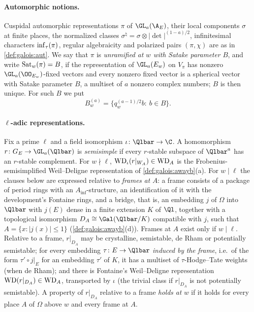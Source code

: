 \paragraph{Automorphic notions.} Cuspidal automorphic representations $\pi$ of $\GL_a(\A_E)$, their local
components $\sigma$ at finite places, the normalized classes $\sigma^\natural=\sigma\otimes|\det|^{(1-a)/2}$,
infinitesimal characters $\operatorname{inf}_\tau(\pi)$, regular algebraicity and polarized pairs $(\pi,\chi)$ are as in
\cref{def:galois:aut}. We say that $\pi$ is \emph{unramified at $w$ with Satake parameter $B$}, and write
$\operatorname{Sat}_w(\pi)=B$, if the representation of $\GL_a(E_w)$ on $V_\pi$ has nonzero $\GL_a(\OO_{E_w})$-fixed
vectors and every nonzero fixed vector is a spherical vector with Satake parameter $B$, a multiset of $a$ nonzero
complex numbers; $B$ is then unique. For such $B$ we put
\[
  B^{(a)}_w=\{q_w^{(a-1)/2}b:\ b\in B\}.
\]

\paragraph{$\ell$-adic representations.} Fix a prime $\ell$ and a field isomorphism $\iota\colon\Qlbar\to\C$. A
homomorphism $r\colon G_E\to\GL_a(\Qlbar)$ is \emph{semisimple} if every $r$-stable subspace of $\Qlbar^a$ has an
$r$-stable complement. For $w\nmid\ell$, $\mathrm{WD}_\iota(r|_{W_A})\in\mathrm{WD}_A$ is the Frobenius-semisimplified
Weil--Deligne representation of \cref{def:galois:awayb}(a). For $w\mid\ell$ the clauses below are expressed
relative to \emph{frames at $A$}: a frame consists of a package of period rings with an $A_{\inf}$-structure, an
identification of it with the development's Fontaine rings, and a bridge, that is, an embedding $j$ of $\Omega$
into $\Qlbar$ with $j(E)$ dense in a finite extension $K$ of $\Ql$, together with a topological isomorphism
$D_A\cong\Gal(\Qlbar/K)$ compatible with $j$, such that $A=\{x:|j(x)|\le1\}$ (\cref{def:galois:awayb}(d)). Frames
at $A$ exist only if $w\mid\ell$. Relative to a frame, $r|_{D_A}$ may be crystalline, semistable, de Rham or
potentially semistable; for every embedding $\tau\colon E\to\Qlbar$ \emph{induced by the frame}, i.e.\ of the form
$\tau'\circ j|_E$ for an embedding $\tau'$ of $K$, it has a multiset of $\tau$-Hodge--Tate weights (when de
Rham); and there is Fontaine's Weil--Deligne representation $\mathrm{WD}(r|_{D_A})\in\mathrm{WD}_A$, transported by
$\iota$ (the trivial class if $r|_{D_A}$ is not potentially semistable). A property of $r|_{D_A}$ relative to a frame
\emph{holds at $w$} if it holds for every place $A$ of $\Omega$ above $w$ and every frame at $A$.


